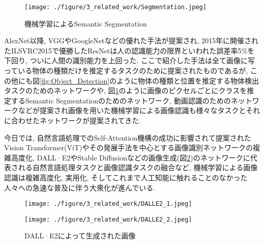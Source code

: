 \begin{figure}[thpb]
  \begin{minipage}[htpb]{1.0\hsize}
  \begin{center}
  \texttt{[image: ./figure/3\_related\_work/Segmentation.jpeg]}
  \caption{機械学習によるSemantic Segmentation}
  \label{fig:Semantic_Segmentation}
  \end{center}
  \end{minipage}
\end{figure}

AlexNet以降, VGG\cite{VGG_paper}やGoogleNet\cite{GoogleNet_paper}などの優れた手法が提案され, 2015年に開催されたILSVRC2015\cite{ILSVRC-2015}で優勝したResNet\cite{ResNet_paper}は人の認識能力の限界といわれた誤差率5\%を下回り, ついに人間の識別能力を上回った. ここで紹介した手法は全て画像に写っている物体の種類だけを推定するタスクのために提案されたものであるが, この他にも図\ref{fig:Object_Detection}のように物体の種類と位置を推定する物体検出タスクのためのネットワーク\cite{R-CNN}\cite{Fast-R-CNN}\cite{YOLO}や, 図\ref{fig:Semantic_Segmentation}のように画像のピクセルごとにクラスを推定するSemantic Segmentationのためのネットワーク\cite{SegNet_paper}, 動画認識のためのネットワーク\cite{3D-ResNet_paper}などが提案され画像を用いた機械学習による画像認識も様々なタスクとそれに合わせたネットワークが提案されてきた. \par
今日では, 自然言語処理でのSelf-Attention機構\cite{Transformer_paper}の成功に影響されて提案されたVision Transformer(ViT)\cite{ViT_paper}やその発展手法\cite{Swin_Transformer_paper}\cite{DeiT_paper}\cite{CvT_paper}\cite{TimeSformer_paper}を中心とする画像識別ネットワークの複雑高度化, DALL·E2\cite{DALLE2_paper}やStable Diffusion\cite{Stable_Diffusion_paper}などの画像生成(図\ref{fig:DALLE})のネットワークに代表される自然言語処理タスクと画像認識タスクの融合など, 機械学習による画像認識は複雑高度化, 実用化, そしてこれまで人工知能に触れることのなかった人々への急速な普及に伴う大衆化が進んでいる.

\begin{figure}[htbp]
  \begin{minipage}[b]{0.5\linewidth}
    \centering
    \texttt{[image: ./figure/3\_related\_work/DALLE2\_1.jpeg]}
  \end{minipage}
  \begin{minipage}[b]{0.5\linewidth}
    \centering
    \texttt{[image: ./figure/3\_related\_work/DALLE2\_2.jpeg]}
  \end{minipage}
  \caption{DALL·E2によって生成された画像}\label{fig:DALLE}
\end{figure}





